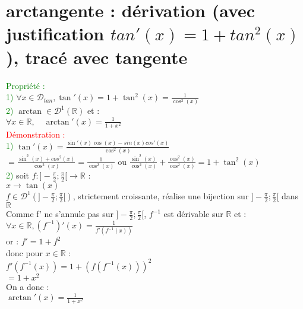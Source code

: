 \documentclass{article}
\begin{document}
	\section{arctangente : dérivation (avec justification $tan'(x)= 1+ tan^2(x)$), tracé avec tangente }
	\textcolor{green}{Propriété :} \\
	 \textcolor{green}{1)} $\forall x \in \mathcal{D}_{tan}, \tan'(x)=1+\tan^2(x)= \frac{1}{\cos^2(x)}$  \\ 
	\textcolor{green}{2)} $\arctan \in \mathcal{D}^1(\mathbb{R})$ et : \\
	$\forall x \in \mathbb{R}, \quad \arctan'(x)=\frac{1}{1+x^2}$ \\
	\textcolor{red}{Démonstration :} \\
	\textcolor{green}{1)}	 $\tan'(x)= \frac{\sin'(x)\cos(x)-sin(x)cos'(x)}{\cos^2(x)}$ \\
	\indent $=\frac{\sin^2(x)+cos^2(x)}{\cos^2(x)} = \frac{1}{\cos^2(x)}$ ou $\frac{\sin^2(x)}{\cos^2(x)} + \frac{\cos^2(x)}{\cos^2(x)}= 1 + \tan^2(x)$ \\
	\textcolor{green}{2)} soit $f : ]-\frac{\pi}{2};\frac{\pi}{2}[ \rightarrow \mathbb{R}$ : \\
	\indent $x \rightarrow \tan(x)$ \\
	$f \in \mathcal{D}^1(]-\frac{\pi}{2};\frac{\pi}{2}[)$, strictement croissante, réalise une bijection sur $]-\frac{\pi}{2};\frac{\pi}{2}[$ dans $\mathbb{R}$ \\
	Comme f' ne s'annule pas sur $]-\frac{\pi}{2};\frac{\pi}{2}[$, $f^{-1}$ est dérivable sur $\mathbb{R}$ et : \\
	$\forall x \in \mathbb{R},(f^{-1})'(x)= \frac{1}{f'(f^{-1}(x))}$ \\
	or : $f'= 1+ f^2$ \\
	donc pour $x \in \mathbb{R}$ : \\
	$f'(f^{-1}(x))=1+(f(f^{-1}(x)))^2$ \\
	\indent $= 1+x^2$ \\
	On a donc : \\
	$\arctan'(x)=\frac{1}{1+x^2}$ \\
\end{document}
